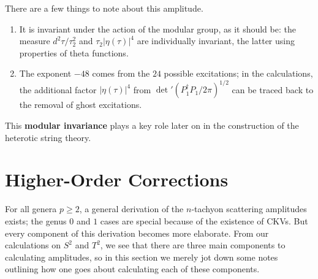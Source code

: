 \documentclass{report}
\theoremstyle{plain}
\theoremstyle{definition}
\theoremstyle{remark}
\begin{document}
There are a few things to note about this amplitude.
\begin{enumerate}
\item It is invariant under the action of the modular group, as it
  should be: the measure $d^2\tau/\tau_2^2$ and $\tau_2|\eta(\tau)|^4$
  are individually invariant, the latter using properties of theta
  functions.
\item The exponent $-48$ comes from the $24$ possible excitations; in
  the calculations, the additional factor $|\eta(\tau)|^4$ from
  $\det'(P_1^\dag P_1/2\pi)^{1/2}$ can be traced back to the removal
  of ghost excitations.
\end{enumerate}
This {\bf modular invariance} plays a key role later on in the
construction of the heterotic string theory.

\section{Higher-Order Corrections}

For all genera $p \ge 2$, a general derivation of the $n$-tachyon
scattering amplitudes exists; the genus $0$ and $1$ cases are special
because of the existence of CKVs. But every component of this
derivation becomes more elaborate. From our calculations on $S^2$ and
$T^2$, we see that there are three main components to calculating
amplitudes, so in this section we merely jot down some notes outlining
how one goes about calculating each of these components.
\end{document}

